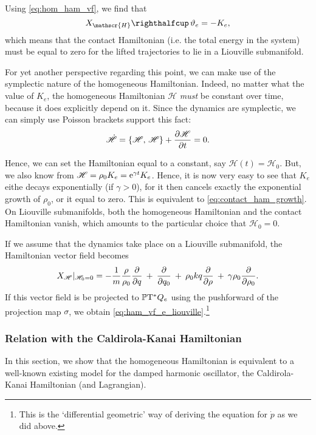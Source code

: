 Using \cref{eq:hom_ham_vf}, we find that 
\begin{equation}
     \intpr{X_\mathscr{H}}{\theta_e} = -K_e,
\end{equation}
which means that the contact Hamiltonian (i.e. the total energy in the system)
must be equal to zero for the lifted trajectories to lie in a Liouville submanifold.

For yet another perspective regarding this point, we can make use of the symplectic nature of the homogeneous Hamiltonian. Indeed, no matter what the value of \(K_e\), the homogeneous Hamiltonian \(\mathscr{H}\) \emph{must} be constant over time, because it does explicitly depend on it. Since the dynamics are symplectic, we can simply use Poisson brackets support this fact:
\begin{equation}
     \dot{\mathscr{H}} = \qty{\mathscr{H},\,\mathscr{H}} + \pdv{\mathscr{H}}{t} = 0.
\end{equation}

Hence, we can set the Hamiltonian equal to a constant, say \(\mathscr{H}(t) = \mathscr{H}_0\). But, we also know from \(\mathscr{H} = \rho_0 K_e = \mathrm{e}^{\gamma t} K_e\). Hence, it is now very easy to see that \(K_e\) eithe  decays exponentially (if \(\gamma > 0\)), for it then cancels exactly the exponential growth of \(\rho_0\), or it equal to zero. This is equivalent to \cref{eq:contact_ham_growth}. On Liouville submanifolds, both the homogeneous Hamiltonian and the contact Hamiltonian vanish, which amounts to the particular choice that \(\mathscr{H}_0 = 0\).

If we assume that the dynamics take place on a Liouville submanifold, the Hamiltonian vector field becomes
\begin{equation}
     X_\mathscr{H}\vert_{\mathscr{H}_0 = 0} =  -\frac{1}{m}\frac{\rho}{\rho_0}\pdv{}{q}\: + \: \pdv{}{q_0}\: + \: \rho_0 kq \pdv{}{\rho}\: + \: \gamma \rho_0 \pdv{}{\rho_0}.
\end{equation}
If this vector field is be projected to \(\mathbb{P}\mathrm{T}^* Q_e\) using the pushforward of the projection map \(\sigma\), we obtain \cref{eq:ham_vf_e_liouville}.\footnote{This is the `differential geometric' way of deriving the equation for \(\dot{p}\) as we did above.}

\subsubsection{Relation with the Caldirola-Kanai Hamiltonian}
In this section, we show that the homogeneous Hamiltonian is equivalent to a well-known existing model for the damped harmonic oscillator, the Caldirola-Kanai Hamiltonian (and Lagrangian).

